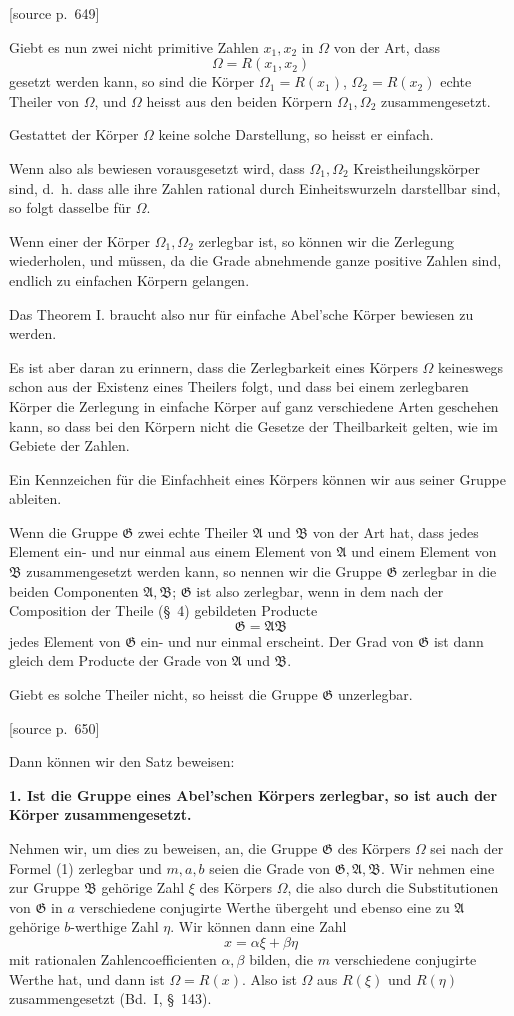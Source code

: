 \documentclass[11pt]{article}
\newcommand{\Om}{\Omega}
\newcommand{\Gg}{\mathfrak G}
\newcommand{\Aa}{\mathfrak A}
\newcommand{\Bb}{\mathfrak B}
\newcommand{\srcpage}[1]{\par\medskip\noindent\textsf{[source p.~#1]}\par\smallskip}
\begin{document}
\srcpage{649}
Giebt es nun zwei nicht primitive Zahlen $x_1,x_2$ in $\Om$ von der Art, dass
\[
  \Om=R(x_1,x_2)
\]
gesetzt werden kann, so sind die Körper $\Om_1=R(x_1)$, $\Om_2=R(x_2)$ echte Theiler von $\Om$, und $\Om$ heisst aus den beiden Körpern $\Om_1,\Om_2$ zusammengesetzt.

Gestattet der Körper $\Om$ keine solche Darstellung, so heisst er einfach.

Wenn also als bewiesen vorausgesetzt wird, dass $\Om_1,\Om_2$ Kreistheilungskörper sind, d.~h. dass alle ihre Zahlen rational durch Einheitswurzeln darstellbar sind, so folgt dasselbe für $\Om$.

Wenn einer der Körper $\Om_1,\Om_2$ zerlegbar ist, so können wir die Zerlegung wiederholen, und müssen, da die Grade abnehmende ganze positive Zahlen sind, endlich zu einfachen Körpern gelangen.

Das Theorem I. braucht also nur für einfache Abel'sche Körper bewiesen zu werden.

Es ist aber daran zu erinnern, dass die Zerlegbarkeit eines Körpers $\Om$ keineswegs schon aus der Existenz eines Theilers folgt, und dass bei einem zerlegbaren Körper die Zerlegung in einfache Körper auf ganz verschiedene Arten geschehen kann, so dass bei den Körpern nicht die Gesetze der Theilbarkeit gelten, wie im Gebiete der Zahlen.

Ein Kennzeichen für die Einfachheit eines Körpers können wir aus seiner Gruppe ableiten.

Wenn die Gruppe $\Gg$ zwei echte Theiler $\Aa$ und $\Bb$ von der Art hat, dass jedes Element ein- und nur einmal aus einem Element von $\Aa$ und einem Element von $\Bb$ zusammengesetzt werden kann, so nennen wir die Gruppe $\Gg$ zerlegbar in die beiden Componenten $\Aa,\Bb$; $\Gg$ ist also zerlegbar, wenn in dem nach der Composition der Theile (\S~4) gebildeten Producte
\begin{equation}
  \Gg=\Aa\Bb
\tag{1}
\end{equation}
jedes Element von $\Gg$ ein- und nur einmal erscheint. Der Grad von $\Gg$ ist dann gleich dem Producte der Grade von $\Aa$ und $\Bb$.

Giebt es solche Theiler nicht, so heisst die Gruppe $\Gg$ unzerlegbar.

\srcpage{650}
Dann können wir den Satz beweisen:

\textbf{1. Ist die Gruppe eines Abel'schen Körpers zerlegbar, so ist auch der Körper zusammengesetzt.}

Nehmen wir, um dies zu beweisen, an, die Gruppe $\Gg$ des Körpers $\Om$ sei nach der Formel (1) zerlegbar und $m,a,b$ seien die Grade von $\Gg,\Aa,\Bb$. Wir nehmen eine zur Gruppe $\Bb$ gehörige Zahl $\xi$ des Körpers $\Om$, die also durch die Substitutionen von $\Gg$ in $a$ verschiedene conjugirte Werthe übergeht und ebenso eine zu $\Aa$ gehörige $b$-werthige Zahl $\eta$. Wir können dann eine Zahl
\[
  x=\alpha\xi+\beta\eta
\]
mit rationalen Zahlencoefficienten $\alpha,\beta$ bilden, die $m$ verschiedene conjugirte Werthe hat, und dann ist $\Om=R(x)$. Also ist $\Om$ aus $R(\xi)$ und $R(\eta)$ zusammengesetzt (Bd.~I, \S~143).
\end{document}
